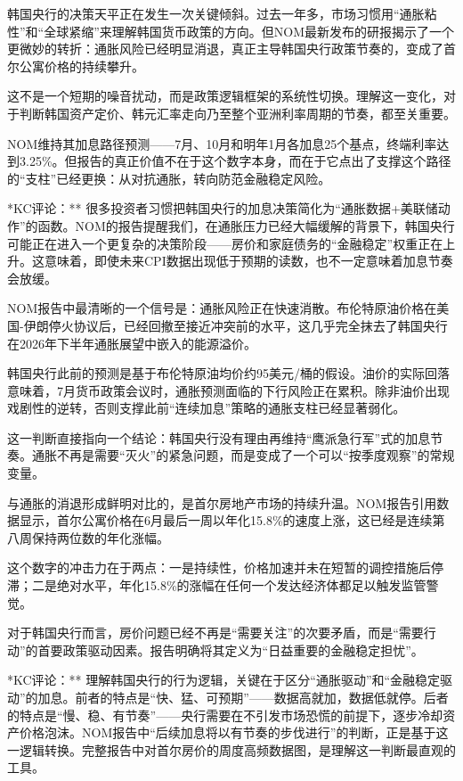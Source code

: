 \documentclass[11pt]{ctexart}
\begin{document}
韩国央行的决策天平正在发生一次关键倾斜。过去一年多，市场习惯用“通胀粘性”和“全球紧缩”来理解韩国货币政策的方向。但NOM最新发布的研报揭示了一个更微妙的转折：通胀风险已经明显消退，真正主导韩国央行政策节奏的，变成了首尔公寓价格的持续攀升。

这不是一个短期的噪音扰动，而是政策逻辑框架的系统性切换。理解这一变化，对于判断韩国资产定价、韩元汇率走向乃至整个亚洲利率周期的节奏，都至关重要。

NOM维持其加息路径预测——7月、10月和明年1月各加息25个基点，终端利率达到3.25\%。但报告的真正价值不在于这个数字本身，而在于它点出了支撑这个路径的“支柱”已经更换：从对抗通胀，转向防范金融稳定风险。

*KC评论：** 很多投资者习惯把韩国央行的加息决策简化为“通胀数据+美联储动作”的函数。NOM的报告提醒我们，在通胀压力已经大幅缓解的背景下，韩国央行可能正在进入一个更复杂的决策阶段——房价和家庭债务的“金融稳定”权重正在上升。这意味着，即使未来CPI数据出现低于预期的读数，也不一定意味着加息节奏会放缓。

NOM报告中最清晰的一个信号是：通胀风险正在快速消散。布伦特原油价格在美国-伊朗停火协议后，已经回撤至接近冲突前的水平，这几乎完全抹去了韩国央行在2026年下半年通胀展望中嵌入的能源溢价。

韩国央行此前的预测是基于布伦特原油均价约95美元/桶的假设。油价的实际回落意味着，7月货币政策会议时，通胀预测面临的下行风险正在累积。除非油价出现戏剧性的逆转，否则支撑此前“连续加息”策略的通胀支柱已经显著弱化。

这一判断直接指向一个结论：韩国央行没有理由再维持“鹰派急行军”式的加息节奏。通胀不再是需要“灭火”的紧急问题，而是变成了一个可以“按季度观察”的常规变量。

与通胀的消退形成鲜明对比的，是首尔房地产市场的持续升温。NOM报告引用数据显示，首尔公寓价格在6月最后一周以年化15.8\%的速度上涨，这已经是连续第八周保持两位数的年化涨幅。

这个数字的冲击力在于两点：一是持续性，价格加速并未在短暂的调控措施后停滞；二是绝对水平，年化15.8\%的涨幅在任何一个发达经济体都足以触发监管警觉。

对于韩国央行而言，房价问题已经不再是“需要关注”的次要矛盾，而是“需要行动”的首要政策驱动因素。报告明确将其定义为“日益重要的金融稳定担忧”。

*KC评论：** 理解韩国央行的行为逻辑，关键在于区分“通胀驱动”和“金融稳定驱动”的加息。前者的特点是“快、猛、可预期”——数据高就加，数据低就停。后者的特点是“慢、稳、有节奏”——央行需要在不引发市场恐慌的前提下，逐步冷却资产价格泡沫。NOM报告中“后续加息将以有节奏的步伐进行”的判断，正是基于这一逻辑转换。完整报告中对首尔房价的周度高频数据图，是理解这一判断最直观的工具。
\end{document}

